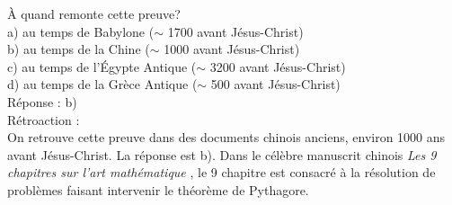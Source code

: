 \documentclass[letterpaper, 12pt]{article}
\begin{document}
\`A quand remonte cette preuve?\\

a) au temps de Babylone ($\sim$ 1700 avant J\'esus-Christ)\\
b) au temps de la Chine ($\sim$ 1000 avant J\'esus-Christ)\\
c) au temps de l'\'Egypte Antique ($\sim$ 3200 avant J\'esus-Christ)\\
d) au temps de la Gr\`ece Antique ($\sim$ 500 avant J\'esus-Christ)\\

R\'eponse : b)\\

R\'etroaction :\\
On retrouve cette preuve dans des documents chinois anciens, environ 1000 ans avant J\'esus-Christ. La r\'eponse est b). Dans le c\'el\`ebre manuscrit chinois \og \emph{Les 9 chapitres sur l'art math\'ematique} \fg, le 9\ieme{} chapitre est consacr\'e \`a la r\'esolution de probl\`emes faisant intervenir le th\'eor\`eme de Pythagore.\\
\end{document}
